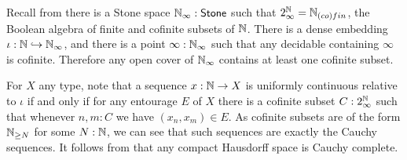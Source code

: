 \begin{remark}
  Recall from \parencite[Example 1.8]{synthetic-stone-duality} there is a Stone space $\mathbb{N}_{\infty}:\mathsf{Stone}$ such that $2^{\mathbb{N}}_{\infty}= \mathbb{N}_{(co)fin}$, the Boolean algebra of finite and cofinite subsets of $\mathbb{N}$. There is a dense embedding $\iota:\mathbb{N} \hookrightarrow \mathbb{N}_{\infty}$, and there is a point $\infty :\mathbb{N}_{\infty}$ such that any decidable containing $\infty$ is cofinite. Therefore any open cover of $\mathbb{N}_{\infty}$ contains at least one cofinite subset. 

  For $X$ any type, note that a sequence $x:\mathbb{N} \to X$ is uniformly continuous relative to $\iota$ if and only if for any entourage $E$ of $X$ there is a cofinite subset $C: 2^{\mathbb{N}}_{\infty}$ such that whenever $n,m:C$ we have $(x_n,x_m)\in E$. As cofinite subsets are of the form $\mathbb{N}_{\geq N}$ for some $N:\mathbb{N}$, we can see that such sequences are exactly the Cauchy sequences. It follows from  that any compact Hausdorff space is Cauchy complete.

\end{remark}
